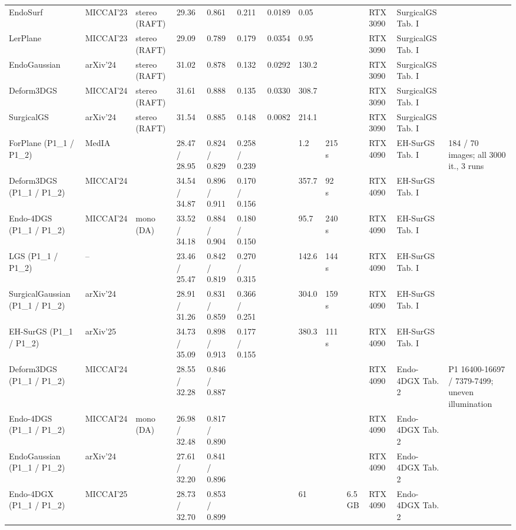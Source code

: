 \documentclass[9pt]{extarticle}
\begin{document}
\begin{longtable}{@{}p{4.2cm}p{1.15cm}p{2.1cm}p{2.2cm}p{2.0cm}p{2.0cm}p{1.35cm}p{0.85cm}p{1.15cm}p{1.0cm}p{1.35cm}p{2.3cm}p{3.6cm}@{}}
EndoSurf & MICCAI'23 & stereo (RAFT) & 29.36 & 0.861 & 0.211 & 0.0189 & 0.05 &  &  & RTX 3090 & SurgicalGS Tab. I &  \\
LerPlane & MICCAI'23 & stereo (RAFT) & 29.09 & 0.789 & 0.179 & 0.0354 & 0.95 &  &  & RTX 3090 & SurgicalGS Tab. I &  \\
EndoGaussian & arXiv'24 & stereo (RAFT) & 31.02 & 0.878 & 0.132 & 0.0292 & 130.2 &  &  & RTX 3090 & SurgicalGS Tab. I &  \\
Deform3DGS & MICCAI'24 & stereo (RAFT) & 31.61 & 0.888 & 0.135 & 0.0330 & 308.7 &  &  & RTX 3090 & SurgicalGS Tab. I &  \\
SurgicalGS & arXiv'24 & stereo (RAFT) & 31.54 & 0.885 & 0.148 & 0.0082 & 214.1 &  &  & RTX 3090 & SurgicalGS Tab. I &  \\
ForPlane (P1\_1 / P1\_2) & MedIA &  & 28.47 / 28.95 & 0.824 / 0.829 & 0.258 / 0.239 &  & 1.2 & 215 s &  & RTX 4090 & EH-SurGS Tab. I & 184 / 70 images; all 3000 it., 3 runs \\
Deform3DGS (P1\_1 / P1\_2) & MICCAI'24 &  & 34.54 / 34.87 & 0.896 / 0.911 & 0.170 / 0.156 &  & 357.7 & 92 s &  & RTX 4090 & EH-SurGS Tab. I &  \\
Endo-4DGS (P1\_1 / P1\_2) & MICCAI'24 & mono (DA) & 33.52 / 34.18 & 0.884 / 0.904 & 0.180 / 0.150 &  & 95.7 & 240 s &  & RTX 4090 & EH-SurGS Tab. I &  \\
LGS (P1\_1 / P1\_2) & -- &  & 23.46 / 25.47 & 0.842 / 0.819 & 0.270 / 0.315 &  & 142.6 & 144 s &  & RTX 4090 & EH-SurGS Tab. I &  \\
SurgicalGaussian (P1\_1 / P1\_2) & arXiv'24 &  & 28.91 / 31.26 & 0.831 / 0.859 & 0.366 / 0.251 &  & 304.0 & 159 s &  & RTX 4090 & EH-SurGS Tab. I &  \\
EH-SurGS (P1\_1 / P1\_2) & arXiv'25 &  & 34.73 / 35.09 & 0.898 / 0.913 & 0.177 / 0.155 &  & 380.3 & 111 s &  & RTX 4090 & EH-SurGS Tab. I &  \\
Deform3DGS (P1\_1 / P1\_2) & MICCAI'24 &  & 28.55 / 32.28 & 0.846 / 0.887 &  &  &  &  &  & RTX 4090 & Endo-4DGX Tab. 2 & P1 16400-16697 / 7379-7499; uneven illumination \\
Endo-4DGS (P1\_1 / P1\_2) & MICCAI'24 & mono (DA) & 26.98 / 32.48 & 0.817 / 0.890 &  &  &  &  &  & RTX 4090 & Endo-4DGX Tab. 2 &  \\
EndoGaussian (P1\_1 / P1\_2) & arXiv'24 &  & 27.61 / 32.20 & 0.841 / 0.896 &  &  &  &  &  & RTX 4090 & Endo-4DGX Tab. 2 &  \\
Endo-4DGX (P1\_1 / P1\_2) & MICCAI'25 &  & 28.73 / 32.70 & 0.853 / 0.899 &  &  & 61 &  & 6.5 GB & RTX 4090 & Endo-4DGX Tab. 2 &  \\

\end{longtable}
\end{document}
